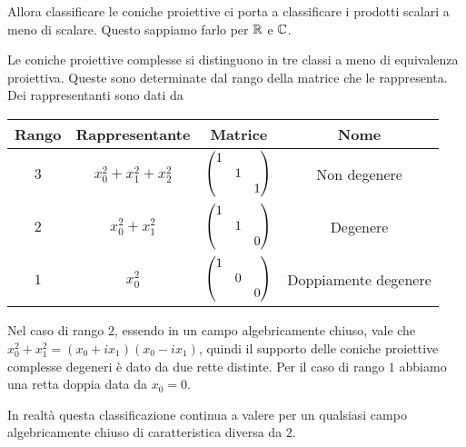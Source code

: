 \begin{multicols*}{2}
    Allora classificare le coniche proiettive ci porta a classificare i prodotti scalari a meno di scalare. Questo sappiamo farlo per $\mathbb{R}$ e $\mathbb{C}$.

    \begin{theorem}
    Le coniche proiettive complesse si distinguono in tre classi a meno di equivalenza proiettiva. Queste sono determinate dal rango della matrice che le rappresenta. Dei rappresentanti sono dati da
    \begin{center}
    \small{\begin{tabular}{|c|c|c|c|}
    \hline
    Rango & Rappresentante & Matrice & Nome\\\hline
    $3$ & $x_0^2+x_1^2+x_2^2$ & $\begin{pmatrix}1&&\\&1&\\&&1\end{pmatrix}$ & Non degenere\\
    $2$ & $x_0^2+x_1^2$ & $\begin{pmatrix}1&&\\&1&\\&&0\end{pmatrix}$ & Degenere\\
    $1$ & $x_0^2$ & $\begin{pmatrix}1&&\\&0&\\&&0\end{pmatrix}$ & Doppiamente degenere\\\hline
    \end{tabular}}
    \end{center}
    \end{theorem}
    \begin{remark}
    Nel caso di rango $2$, essendo in un campo algebricamente chiuso, vale che $x_0^2+x_1^2=(x_0+ix_1)(x_0-ix_1)$, quindi il supporto delle coniche proiettive complesse degeneri \`e dato da due rette distinte. Per il caso di rango $1$ abbiamo una retta doppia data da $x_0=0$.
    \end{remark}
    \begin{remark}
    In realt\`a questa classificazione continua a valere per un qualsiasi campo algebricamente chiuso di caratteristica diversa da $2$.
    \end{remark}


\end{multicols*}
